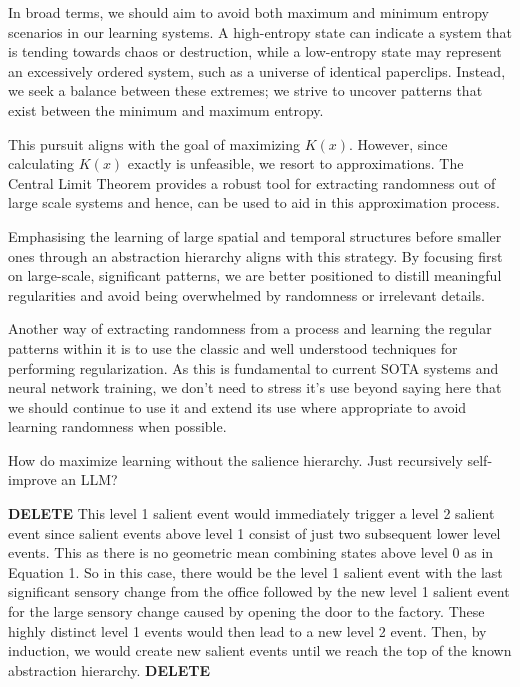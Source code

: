 \documentclass{article}
\begin{document}
In broad terms, we should aim to avoid both maximum and minimum entropy scenarios in our learning systems. A high-entropy state can indicate a system that is tending towards chaos or destruction, while a low-entropy state may represent an excessively ordered system, such as a universe of identical paperclips. Instead, we seek a balance between these extremes; we strive to uncover patterns that exist between the minimum and maximum entropy.

This pursuit aligns with the goal of maximizing $K(x)$. However, since calculating $K(x)$ exactly is unfeasible, we resort to approximations. The Central Limit Theorem provides a robust tool for extracting randomness out of large scale systems and hence, can be used to aid in this approximation process.

Emphasising the learning of large spatial and temporal structures before smaller ones through an abstraction hierarchy aligns with this strategy. By focusing first on large-scale, significant patterns, we are better positioned to distill meaningful regularities and avoid being overwhelmed by randomness or irrelevant details.

Another way of extracting randomness from a process and learning the regular patterns within it is to use the classic and well understood techniques for performing regularization. As this is fundamental to current SOTA systems and neural network training, we don't need to stress it's use beyond saying here that we should continue to use it and extend its use where appropriate to avoid learning randomness when possible.

\hspace{}


How do maximize learning without the salience hierarchy. Just recursively self-improve an LLM?

\textbf{DELETE} This level 1 salient event would immediately trigger a level 2 salient event since salient events above level 1 consist of just two subsequent lower level events. This as there is no geometric mean combining states above level 0 as in Equation 1. So in this case, there would be the level 1 salient event with the last significant sensory change from the office followed by the new level 1 salient event for the large sensory change caused by opening the door to the factory. These highly distinct level 1 events would then lead to a new level 2 event. Then, by induction, we would create new salient events until we reach the top of the known abstraction hierarchy. \textbf{DELETE}
\end{document}
